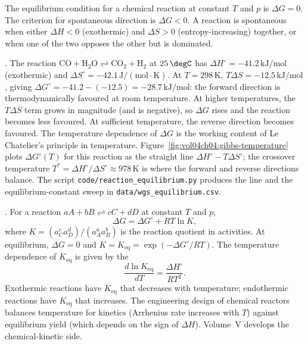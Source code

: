 The equilibrium condition for a chemical reaction at constant $T$
and $p$ is $\Delta G = 0$. The criterion for spontaneous direction is
$\Delta G < 0$. A reaction is spontaneous when either $\Delta H <
0$ (exothermic) and $\Delta S > 0$ (entropy-increasing) together, or
when one of the two opposes the other but is dominated.

. The reaction
$\text{CO} + \text{H}_2\text{O} \rightleftharpoons \text{CO}_2 +
\text{H}_2$ at $25\,\degC$ has $\Delta H^\circ = -41.2\,\text{kJ}/
\text{mol}$ (exothermic) and $\Delta S^\circ = -42.1\,\text{J}/(
\text{mol}\cdot\si{\kelvin})$. At $T = 298\,\si{\kelvin}$,
$T \Delta S = -12.5\,\text{kJ}/\text{mol}$, giving $\Delta G^\circ =
-41.2 - (-12.5) = -28.7\,\text{kJ}/\text{mol}$: the forward direction
is thermodynamically favoured at room temperature. At higher
temperatures, the $T \Delta S$ term grows in magnitude (and is
negative), so $\Delta G$ rises and the reaction becomes less
favoured. At sufficient temperature, the reverse direction becomes
favoured. The temperature dependence of $\Delta G$ is the working
content of Le Chatelier's principle in temperature.
Figure~\ref{fig:vol04ch04:gibbs-temperature} plots $\Delta G^\circ(T)$
for this reaction as the straight line $\Delta H^\circ - T\Delta S^\circ$;
the crossover temperature $T^\ast = \Delta H^\circ/\Delta S^\circ \approx
978\,\si{\kelvin}$ is where the forward and reverse directions balance.
The script \texttt{code/reaction\_equilibrium.py} produces the line and
the equilibrium-constant sweep in \texttt{data/wgs\_equilibrium.csv}.



. For a reaction $aA + bB
\rightleftharpoons cC + dD$ at constant $T$ and $p$,
\[
\Delta G = \Delta G^\circ + RT \ln K,
\]
where $K = (a_C^c a_D^d)/(a_A^a a_B^b)$ is the reaction quotient in
activities. At equilibrium, $\Delta G = 0$ and $K = K_{\text{eq}} =
\exp(-\Delta G^\circ/RT)$. The temperature dependence of $K_{\text{eq}}$
is given by the 
\[
\frac{d \ln K_{\text{eq}}}{dT} = \frac{\Delta H^\circ}{RT^2}.
\]
Exothermic reactions have $K_{\text{eq}}$ that decreases with
temperature; endothermic reactions have $K_{\text{eq}}$ that
increases. The engineering design of chemical reactors balances
temperature for kinetics (Arrhenius rate increases with $T$) against
equilibrium yield (which depends on the sign of $\Delta H$).
Volume~V develops the chemical-kinetic side.

